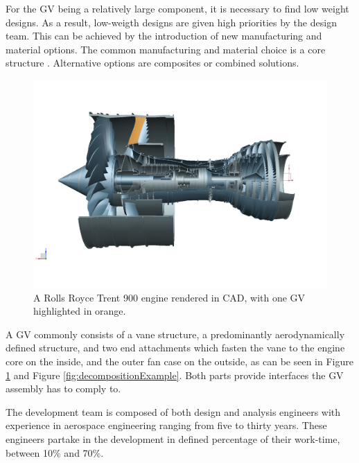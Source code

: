 \documentclass[aerospace,article,submit,moreauthors,pdftex]{Definitions/mdpi}
\newcommand{\Jakob}[1]{{{\color{orange}{\itshape{#1}}\color{black}}
    }{\ignorespaces}}
\newcommand{\revision}[1]{{{\color{ForestGreen}{{#1}}\color{black}}
    }{\ignorespaces}}
\begin{document}
For the \ac{GV} being a relatively large component, it is necessary to find low weight designs.
As a result, low-weigth designs are given high priorities by the design team.
This can be achieved  by the introduction of new manufacturing and material options.
The common manufacturing and material choice is a \revision{metallic}  core structure \cite{Sjunnesson2019}.
Alternative options are composites or combined solutions.


\begin{figure}[th!]
    \begin{center}
    \centering
        \includegraphics[width=.8\textwidth]{figures/trent9000_OGV.png}

        \caption{A Rolls Royce Trent 900 engine rendered in CAD\protect\footnotemark, with one GV highlighted in orange.
        }
        \label{fig:turbine}
    \end{center}
\end{figure}


A \ac{GV} commonly consists of a vane structure, a predominantly aerodynamically defined structure, and two end attachments which fasten the vane to the engine core on the inside, and the outer fan case on the outside, as can be seen in Figure \ref{fig:turbine} and Figure \ref{fig:decompositionExample}.
Both parts provide interfaces the \ac{GV} assembly has to comply to.

The development team is composed of both design and analysis engineers with experience in aerospace engineering ranging from five to thirty years.
These engineers partake in the development in defined percentage of their work-time, between 10\% and 70\%. 
\\
\end{document}

